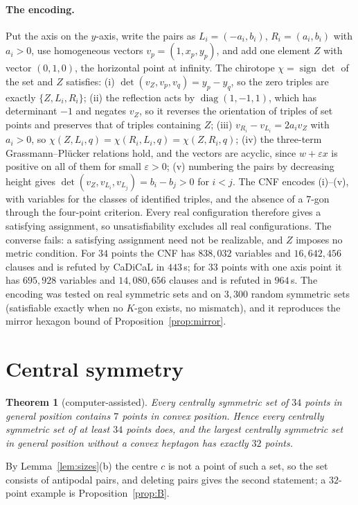 \documentclass[11pt]{article}
\newtheorem{theorem}{Theorem}
\theoremstyle{remark}
\begin{document}
\paragraph{The encoding.} Put the axis on the $y$-axis, write the pairs as $L_i=(-a_i,b_i)$, $R_i=(a_i,b_i)$ with
$a_i>0$, use homogeneous vectors $v_p=(1,x_p,y_p)$, and add one element $Z$ with vector $(0,1,0)$, the horizontal point
at infinity. The chirotope $\chi=\operatorname{sign}\det$ of the set and $Z$ satisfies:
(i) $\det(v_Z,v_p,v_q)=y_p-y_q$, so the zero triples are exactly $\{Z,L_i,R_i\}$;
(ii) the reflection acts by $\operatorname{diag}(1,-1,1)$, which has determinant $-1$ and negates $v_Z$, so it reverses
the orientation of triples of set points and preserves that of triples containing $Z$;
(iii) $v_{R_i}-v_{L_i}=2a_iv_Z$ with $a_i>0$, so $\chi(Z,L_i,q)=\chi(R_i,L_i,q)=\chi(Z,R_i,q)$;
(iv) the three-term Grassmann--Pl\"ucker relations hold, and the vectors are acyclic, since $w+\varepsilon x$ is positive
on all of them for small $\varepsilon>0$;
(v) numbering the pairs by decreasing height gives $\det(v_Z,v_{L_i},v_{L_j})=b_i-b_j>0$ for $i<j$.
The CNF encodes (i)--(v), with variables for the classes of identified triples, and the absence of a $7$-gon through the
four-point criterion. Every real configuration therefore gives a satisfying assignment, so unsatisfiability excludes
all real configurations. The converse fails: a satisfying assignment need not be realizable, and $Z$ imposes no metric
condition. For $34$ points the CNF has $838{,}032$ variables and $16{,}642{,}456$ clauses and is refuted by CaDiCaL in
$443$\,s; for $33$ points with one axis point it has $695{,}928$ variables and $14{,}080{,}656$ clauses and is refuted in
$964$\,s. The encoding was tested on real symmetric sets and on $3{,}300$ random symmetric sets (satisfiable exactly when
no $K$-gon exists, no mismatch), and it reproduces the mirror hexagon bound of Proposition~\ref{prop:mirror}.

\section{Central symmetry}\label{sec:central}
\begin{theorem}[computer-assisted]\label{thm:C2}
Every centrally symmetric set of $34$ points in general position contains $7$ points in convex position. Hence every
centrally symmetric set of at least $34$ points does, and the largest centrally symmetric set in general position without
a convex heptagon has exactly $32$ points.
\end{theorem}
By Lemma~\ref{lem:sizes}(b) the centre $c$ is not a point of such a set, so the set consists of antipodal pairs, and
deleting pairs gives the second statement; a $32$-point example is Proposition~\ref{prop:B}.
\end{document}
